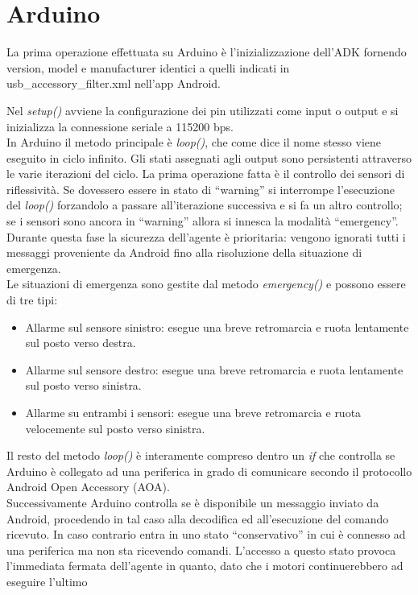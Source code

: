 \section {Arduino} 
La prima operazione effettuata su Arduino è l'inizializzazione dell'ADK fornendo 
version, model e manufacturer identici a quelli indicati in usb\_accessory\_filter.xml 
nell'app Android.

Nel \emph{setup()} avviene la configurazione dei pin utilizzati come input o output e si inizializza
la connessione seriale a 115200 bps.\\
In Arduino il metodo principale è \emph{loop()}, che come dice il nome stesso viene eseguito
in ciclo infinito. Gli stati assegnati agli output sono persistenti attraverso 
le varie iterazioni del ciclo.
La prima operazione fatta è il controllo dei sensori di riflessività. Se dovessero 
essere in stato di ``warning'' si interrompe l'esecuzione del \emph{loop()} 
forzandolo a passare all'iterazione successiva e si fa un altro controllo; se i 
sensori sono ancora in ``warning'' allora si innesca la modalità ``emergency''.
Durante questa fase la sicurezza dell'agente è prioritaria: vengono ignorati tutti 
i messaggi proveniente da Android fino alla risoluzione della situazione di emergenza.\\
Le situazioni di emergenza sono gestite dal metodo \emph{emergency()} e possono 
essere di tre tipi:
\begin{itemize}
	\item Allarme sul sensore sinistro: esegue una breve retromarcia 
	e ruota lentamente sul posto verso destra.
	\item Allarme sul sensore destro: esegue una breve retromarcia 
	e ruota lentamente sul posto verso sinistra.
	\item Allarme su entrambi i sensori: esegue una breve retromarcia 
	e ruota velocemente sul posto verso sinistra.
\end{itemize}
Il resto del metodo \emph{loop()} è interamente compreso dentro un
\emph{if} che controlla se Arduino è collegato ad una periferica in grado di 
comunicare secondo il protocollo Android Open Accessory (AOA).\\
Successivamente Arduino controlla se è disponibile un messaggio inviato da Android, 
procedendo in tal caso alla decodifica ed all'esecuzione del comando ricevuto. 
In caso contrario entra in uno stato ``conservativo'' in cui è connesso ad una periferica 
ma non sta ricevendo comandi. L'accesso a questo stato provoca l'immediata fermata 
dell'agente in quanto, dato che i motori continuerebbero ad eseguire l'ultimo 
